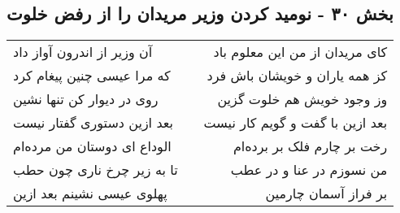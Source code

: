 \begin{center}
\section*{بخش ۳۰ - نومید کردن وزیر مریدان را از رفض خلوت}
\label{sec:sh030}
\begin{longtable}{l p{0.5cm} r}
آن وزیر از اندرون آواز داد
&&
کای مریدان از من این معلوم باد
\\
که مرا عیسی چنین پیغام کرد
&&
کز همه یاران و خویشان باش فرد
\\
روی در دیوار کن تنها نشین
&&
وز وجود خویش هم خلوت گزین
\\
بعد ازین دستوری گفتار نیست
&&
بعد ازین با گفت و گویم کار نیست
\\
الوداع ای دوستان من مرده‌ام
&&
رخت بر چارم فلک بر برده‌ام
\\
تا به زیر چرخ ناری چون حطب
&&
من نسوزم در عنا و در عطب
\\
پهلوی عیسی نشینم بعد ازین
&&
بر فراز آسمان چارمین
\\
\end{longtable}
\end{center}

